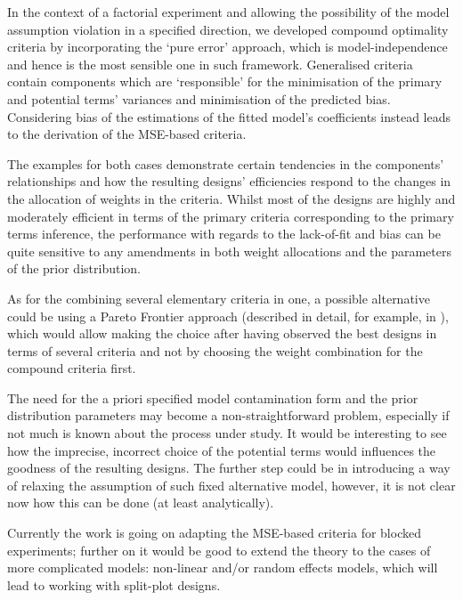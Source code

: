 In the context of a factorial experiment and allowing the possibility of the model assumption violation in a specified direction, we developed compound optimality criteria by incorporating the `pure error' approach, which is model-independence and hence is the most sensible one in such framework. Generalised criteria contain components which are `responsible' for the minimisation of the primary and potential terms' variances and minimisation of the predicted bias. Considering bias of the estimations of the fitted model's coefficients instead leads to the derivation of the MSE-based criteria. 

The examples for both cases demonstrate certain tendencies in the components' relationships and how the resulting designs' efficiencies respond to the changes in the allocation of weights in the criteria. Whilst most of the designs are highly and moderately efficient in terms of the primary criteria corresponding to the primary terms inference, the performance with regards to the lack-of-fit and bias can be quite sensitive to any amendments in both weight allocations and the parameters of the prior distribution. 

As for the combining several elementary criteria in one, a possible alternative could be using a Pareto Frontier approach (described in detail, for example, in \citealp{lu2011optimization}), which would allow making the choice after having observed the best designs in terms of several criteria and not by choosing the weight combination for the compound criteria first.

The need for the a priori specified model contamination form and the prior distribution parameters may become a non-straightforward problem, especially if not much is known about the process under study. It would be interesting to see how the imprecise, incorrect choice of the potential terms would influences the goodness of the resulting designs. The further step could be in introducing a way of relaxing the assumption of such fixed alternative model, however, it is not clear now how this can be done (at least analytically).

Currently the work is going on adapting the MSE-based criteria for blocked experiments; further on it would be good to extend the theory to the cases of more complicated models: non-linear and/or random effects models, which will lead to working with split-plot designs.            